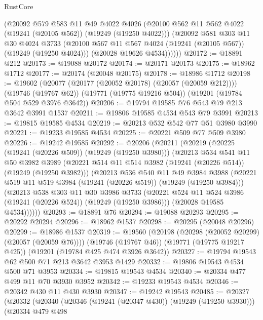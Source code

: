 \begin{lexlean}{RustCore}
\begin{coremodule}
          (@20092
            @579
            @583
            @11
            @49
            @4022
            @4026
            (@20100 @562 @11 @562 @4022 (@19241 (@20105 @562)) (@19249 (@19250 @4022)))
            (@20092
              @581
              @303
              @11
              @30
              @4024
              @3733
              (@20100 @567 @11 @567 @4024 (@19241 (@20105 @567)) (@19249 (@19250 @4024)))
              (@20028 @19626 @4534))))))
@20172 := @18891 @212
@20173 := @19088 @20172
@20174 := @20171 @20173
@20175 := @18962 @1712
@20177 := @20174 (@20048 @20175)
@20178 := @18986 @1712
@20198 := @19602
    (@20077 (@20177 (@20052 @20178) (@20057 (@20059 @212))))
    (@19746 (@19767 @62))
    (@19771 (@19775 @19216 @504))
    (@19201 (@19784 @504 @529 @3976 @3642))
@20206 := @19794 @19585 @76 @543 @79 @213 @3642 @3991 @1537
@20211 := @19806 @19585 @4534 @543 @79 @3991
@20213 := @19815 @19585 @4534
@20219 := @20213 @532 @542 @77 @51 @3980 @3990
@20221 := @19233 @19585 @4534
@20225 := @20221 @509 @77 @509 @3980
@20226 := @19242 @19585
@20292 := @20206
    (@20211
      (@20219
        (@20225 (@19241 (@20226 @509)) (@19249 (@19250 @3980)))
        (@20213
          @534
          @541
          @11
          @50
          @3982
          @3989
          (@20221 @514 @11 @514 @3982 (@19241 (@20226 @514)) (@19249 (@19250 @3982)))
          (@20213
            @536
            @540
            @11
            @49
            @3984
            @3988
            (@20221 @519 @11 @519 @3984 (@19241 (@20226 @519)) (@19249 (@19250 @3984)))
            (@20213
              @538
              @303
              @11
              @30
              @3986
              @3733
              (@20221 @524 @11 @524 @3986 (@19241 (@20226 @524)) (@19249 (@19250 @3986)))
              (@20028 @19585 @4534))))))
@20293 := @18891 @76
@20294 := @19088 @20293
@20295 := @20292 @20294
@20296 := @18962 @1537
@20298 := @20295 (@20048 @20296)
@20299 := @18986 @1537
@20319 := @19560
    (@20198 (@20298 (@20052 @20299) (@20057 (@20059 @76))))
    (@19746 (@19767 @46))
    (@19771 (@19775 @19217 @425))
    (@19201 (@19784 @425 @474 @3926 @3642))
@20327 := @19794 @19543 @62 @500 @71 @213 @3642 @3953 @1429
@20332 := @19806 @19543 @4534 @500 @71 @3953
@20334 := @19815 @19543 @4534
@20340 := @20334 @477 @499 @11 @70 @3930 @3952
@20342 := @19233 @19543 @4534
@20346 := @20342 @430 @11 @430 @3930
@20347 := @19242 @19543
@20485 := @20327
    (@20332
      (@20340
        (@20346 (@19241 (@20347 @430)) (@19249 (@19250 @3930)))
        (@20334
          @479
          @498

\end{coremodule}
\end{lexlean}
